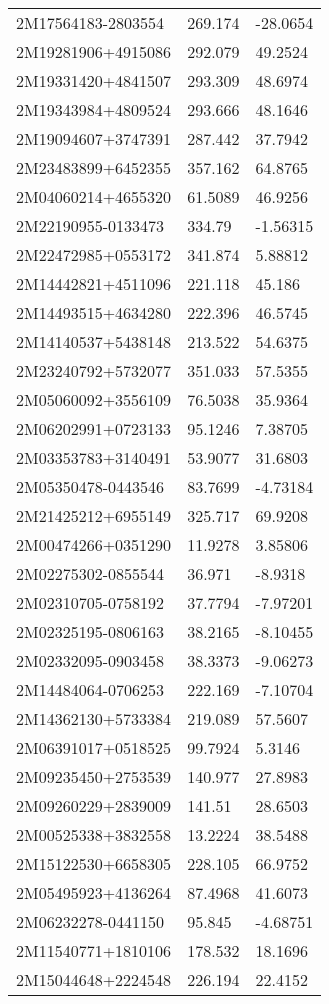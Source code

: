 \documentclass[fleqn,usenatbib]{mnras}
\begin{document}
\begin{table}
\begin{tabular}{lll}
2M17564183-2803554 &  269.174 &  -28.0654 \\
2M19281906+4915086 &  292.079 &   49.2524 \\
2M19331420+4841507 &  293.309 &   48.6974 \\
2M19343984+4809524 &  293.666 &   48.1646 \\
2M19094607+3747391 &  287.442 &   37.7942 \\
2M23483899+6452355 &  357.162 &   64.8765 \\
2M04060214+4655320 &  61.5089 &   46.9256 \\
2M22190955-0133473 &   334.79 &  -1.56315 \\
2M22472985+0553172 &  341.874 &   5.88812 \\
2M14442821+4511096 &  221.118 &    45.186 \\
2M14493515+4634280 &  222.396 &   46.5745 \\
2M14140537+5438148 &  213.522 &   54.6375 \\
2M23240792+5732077 &  351.033 &   57.5355 \\
2M05060092+3556109 &  76.5038 &   35.9364 \\
2M06202991+0723133 &  95.1246 &   7.38705 \\
2M03353783+3140491 &  53.9077 &   31.6803 \\
2M05350478-0443546 &  83.7699 &  -4.73184 \\
2M21425212+6955149 &  325.717 &   69.9208 \\
2M00474266+0351290 &  11.9278 &   3.85806 \\
2M02275302-0855544 &   36.971 &   -8.9318 \\
2M02310705-0758192 &  37.7794 &  -7.97201 \\
2M02325195-0806163 &  38.2165 &  -8.10455 \\
2M02332095-0903458 &  38.3373 &  -9.06273 \\
2M14484064-0706253 &  222.169 &  -7.10704 \\
2M14362130+5733384 &  219.089 &   57.5607 \\
2M06391017+0518525 &  99.7924 &    5.3146 \\
2M09235450+2753539 &  140.977 &   27.8983 \\
2M09260229+2839009 &   141.51 &   28.6503 \\
2M00525338+3832558 &  13.2224 &   38.5488 \\
2M15122530+6658305 &  228.105 &   66.9752 \\
2M05495923+4136264 &  87.4968 &   41.6073 \\
2M06232278-0441150 &   95.845 &  -4.68751 \\
2M11540771+1810106 &  178.532 &   18.1696 \\
2M15044648+2224548 &  226.194 &   22.4152 \\
  \bottomrule
  \end{tabular}
\end{table}




\bsp	%
\label{lastpage}
\end{document}
